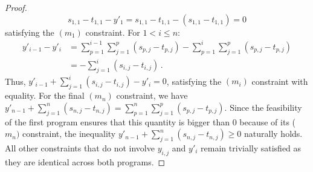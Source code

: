 \begin{proof}
    \begin{equation*}
        s_{1,1} - t_{1,1} - y'_1 = s_{1,1} - t_{1,1} - (s_{1,1} - t_{1,1}) = 0
    \end{equation*}
    satisfying the $(m_1)$ constraint.
    For $1 < i \le n$:
    \begin{align*}
        y'_{i-1} - y'_i &= \sum_{p=1}^{i-1} \sum_{j=1}^p (s_{p,j} - t_{p,j}) - \sum_{p=1}^i \sum_{j=1}^p (s_{p,j} - t_{p,j}) \\
        &= - \sum_{j=1}^i (s_{i,j} - t_{i,j})\,.
    \end{align*}
    Thus, $y'_{i-1} + \sum_{j=1}^i (s_{i,j} - t_{i,j}) - y'_i = 0$, satisfying the $(m_i)$ constraint with equality.
    For the final $(m_n)$ constraint, we have $y'_{n-1} + \sum_{j=1}^n (s_{n,j} - t_{n,j}) = \sum_{p=1}^{n} \sum_{j=1}^p (s_{p,j} - t_{p,j})$. Since the feasibility of the first program ensures that this quantity is bigger than $0$ because of its ($m_{n})$ constraint, the inequality $y'_{n-1} + \sum_{j=1}^n (s_{n,j} - t_{n,j}) \ge 0$ naturally holds. All other constraints that do not involve $y_{i,j}$ and $y'_i$ remain trivially satisfied as they are identical across both programs.
    

\end{proof}
